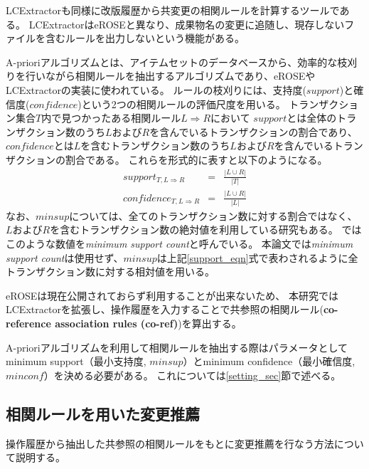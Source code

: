 \documentclass[a4paper]{jsbook}
\def\Ra{\Rightarrow}
\newcommand{\minconf}{mincon\!f}
\newcommand{\confidence}{con\!f\!idence}
\begin{document}
LCExtractor\cite{Hagward:2015,Mori:2015}も同様に改版履歴から共変更の相関ルールを計算するツールである。
LCExtractorはeROSEと異なり、成果物名の変更に追随し、現存しないファイルを含むルールを出力しないという機能がある。

A-prioriアルゴリズム\cite{Bondugula:2006}とは、アイテムセットのデータベースから、効率的な枝刈りを行いながら相関ルールを抽出するアルゴリズムであり、eROSEやLCExtractorの実装に使われている。
ルールの枝刈りには、支持度($support$)と確信度($\confidence$)という2つの相関ルールの評価尺度を用いる。
トランザクション集合$T$内で見つかったある相関ルール$L \Ra R$において
$support$とは全体のトランザクション数のうち$L$および$R$を含んでいるトランザクションの割合であり、
$\confidence$とは$L$を含むトランザクション数のうち$L$および$R$を含んでいるトランザクションの割合である。
これらを形式的に表すと以下のようになる。
\begin{eqnarray}
  support_{T,L \Ra R} &=& \frac{| L \cup R |}{|T|} \label{support_eqn}\\
  \confidence_{T,L \Ra R} &=& \frac{| L \cup R |}{|L|}\label{confidence_eqn}
\end{eqnarray}
なお、$minsup$については、全てのトランザクション数に対する割合ではなく、$L$および$R$を含むトランザクション数の絶対値を利用している研究もある。
\cite{Zimmermann:2005}ではこのような数値を{\it minimum support count}と呼んでいる。
本論文では{\it minimum support count}は使用せず、$minsup$は上記\ref{support_eqn}式で表わされるように全トランザクション数に対する相対値を用いる。

eROSEは現在公開されておらず利用することが出来ないため、
本研究ではLCExtractorを拡張し、操作履歴を入力することで共参照の相関ルール({\bf co-reference association rules (co-ref)})を算出する。

A-prioriアルゴリズムを利用して相関ルールを抽出する際はパラメータとしてminimum support（最小支持度, $minsup$）とminimum confidence（最小確信度, $\minconf$）を決める必要がある。
これについては\ref{setting_sec}節で述べる。


\subsection{相関ルールを用いた変更推薦}\label{ranking_sec}
操作履歴から抽出した共参照の相関ルールをもとに変更推薦を行なう方法について説明する。
\end{document}
